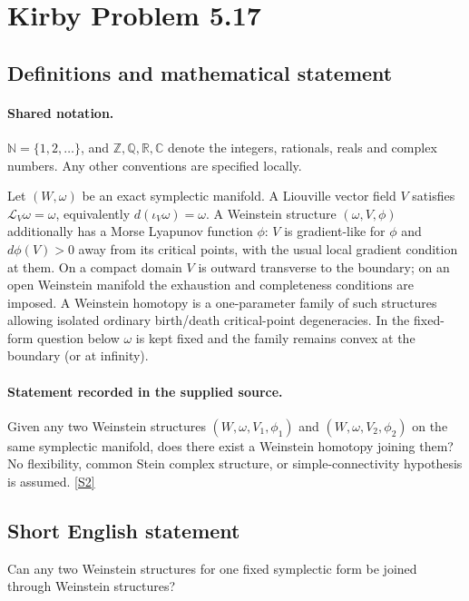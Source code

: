 \documentclass[11pt]{article}
\newcommand{\sref}[2]{\hyperlink{source:#1:#2}{[S#2]}}
\begin{document}
\section{Kirby Problem 5.17}\label{statement}

\subsection{Definitions and mathematical statement}

\paragraph{Shared notation.}$\mathbb N=\{1,2,\ldots\}$, and $\mathbb Z,\mathbb Q,\mathbb R,\mathbb C$ denote the integers, rationals, reals and complex numbers. Any other conventions are specified locally.


Let $(W,\omega)$ be an exact symplectic manifold. A Liouville vector field $V$ satisfies $\mathcal L_V\omega=\omega$, equivalently $d(\iota_V\omega)=\omega$. A Weinstein structure $(\omega,V,\phi)$ additionally has a Morse Lyapunov function $\phi$: $V$ is gradient-like for $\phi$ and $d\phi(V)>0$ away from its critical points, with the usual local gradient condition at them. On a compact domain $V$ is outward transverse to the boundary; on an open Weinstein manifold the exhaustion and completeness conditions are imposed. A Weinstein homotopy is a one-parameter family of such structures allowing isolated ordinary birth/death critical-point degeneracies. In the fixed-form question below $\omega$ is kept fixed and the family remains convex at the boundary (or at infinity).
\paragraph{Statement recorded in the supplied source.}
Given any two Weinstein structures $(W,\omega,V_1,\phi_1)$ and $(W,\omega,V_2,\phi_2)$ on the same symplectic manifold, does there exist a Weinstein homotopy joining them? No flexibility, common Stein complex structure, or simple-connectivity hypothesis is assumed. \sref{statement}{2}
\subsection{Short English statement}
Can any two Weinstein structures for one fixed symplectic form be joined through Weinstein structures?
\end{document}
